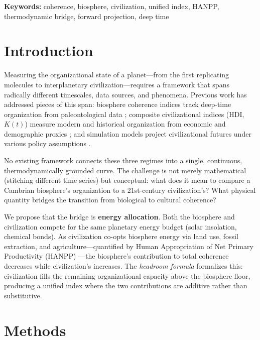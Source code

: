 \documentclass[10pt,letterpaper]{article}
\newcommand{\kt}{$K(t)$}
\begin{document}
\noindent\textbf{Keywords:} coherence, biosphere, civilization, unified
index, HANPP, thermodynamic bridge, forward projection, deep time

\linenumbers

\section*{Introduction}

Measuring the organizational state of a planet---from the first
replicating molecules to interplanetary civilization---requires a
framework that spans radically different timescales, data sources, and
phenomena. Previous work has addressed pieces of this span: biosphere
coherence indices track deep-time organization from paleontological data
\cite{stoltz2026bt}; composite civilizational indices (HDI, \kt{})
measure modern and historical organization from economic and
demographic proxies \cite{stoltz2026kt, undp2020}; and simulation
models project civilizational futures under various policy assumptions
\cite{stoltz2026sim}.

No existing framework connects these three regimes into a single,
continuous, thermodynamically grounded curve. The challenge is not
merely mathematical (stitching different time series) but conceptual:
what does it mean to compare a Cambrian biosphere's organization to a
21st-century civilization's? What physical quantity bridges the
transition from biological to cultural coherence?

We propose that the bridge is \textbf{energy allocation}. Both the
biosphere and civilization compete for the same planetary energy budget
(solar insolation, chemical bonds). As civilization co-opts biosphere
energy via land use, fossil extraction, and agriculture---quantified by
Human Appropriation of Net Primary Productivity (HANPP)
\cite{haberl2007}---the biosphere's contribution to total coherence
decreases while civilization's increases. The \emph{headroom formula}
formalizes this: civilization fills the remaining organizational capacity
above the biosphere floor, producing a unified index where the two
contributions are additive rather than substitutive.

\section*{Methods}
\end{document}
